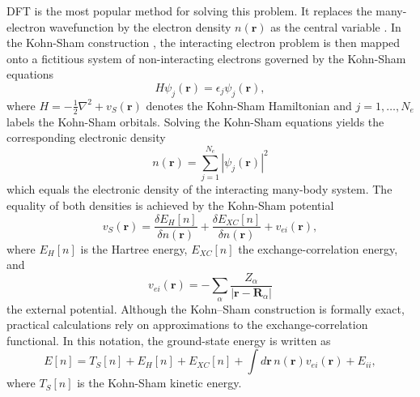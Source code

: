 \documentclass[preprint,12pt,compress,numafflabel]{elsarticle}
\begin{document}
DFT is the most popular method for solving this problem. It replaces the many-electron wavefunction by the electron density $n(\bm{r})$ as the central variable \cite{HoKo1964}. In the Kohn-Sham construction \cite{KoSh1965}, the interacting electron problem is then mapped onto a fictitious system of non-interacting electrons governed by the Kohn-Sham equations
\begin{equation}
H \psi_j(\bm{r}) = \epsilon_j \psi_j(\bm{r}),
\end{equation}
where $H = -\frac{1}{2}\nabla^2 + v_S(\bm{r})$ denotes the Kohn-Sham Hamiltonian and $j=1,\dots,N_e$ labels the Kohn-Sham orbitals. Solving the Kohn-Sham equations yields the corresponding electronic density
\begin{equation}
n(\bm{r}) = \sum_{j=1}^{N_e} |\psi_j(\bm{r})|^2
\end{equation}
which equals the electronic density of the interacting many-body system. The equality of both densities is achieved by the Kohn-Sham potential
\begin{equation}
v_S(\bm{r}) =
\frac{\delta E_H[n]}{\delta n(\bm{r})}
+ \frac{\delta E_{XC}[n]}{\delta n(\bm{r})}
+ v_{ei}(\bm{r}),
\end{equation}
where $E_H[n]$ is the Hartree energy, $E_{XC}[n]$ the exchange-correlation energy, and
\begin{equation}
v_{ei}(\bm{r}) = -\sum_{\alpha} \frac{Z_{\alpha}}{|\bm{r}-\bm{R}_{\alpha}|}
\end{equation}
the external potential. Although the Kohn--Sham construction is formally exact, practical calculations rely on approximations to the exchange-correlation functional.
In this notation, the ground-state energy is written as
\begin{equation}
E[n] =
T_S[n] + E_H[n] + E_{XC}[n]
+ \int d\bm{r}\, n(\bm{r}) v_{ei}(\bm{r})
+ E_{ii},
\end{equation}
where $T_S[n]$ is the Kohn-Sham kinetic energy.
\end{document}
